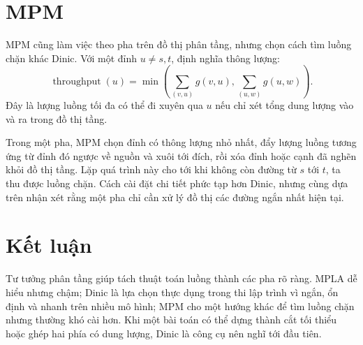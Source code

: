 \documentclass[11pt]{article}
\newcommand{\throughput}{\operatorname{throughput}}
\begin{document}
\section{MPM}

MPM cũng làm việc theo pha trên đồ thị phân tầng, nhưng chọn cách tìm luồng
chặn khác Dinic. Với một đỉnh \(u\ne s,t\), định nghĩa thông lượng:
\[
  \throughput(u)=
  \min\left(
    \sum_{(v,u)} g(v,u),
    \sum_{(u,w)} g(u,w)
  \right).
\]
Đây là lượng luồng tối đa có thể đi xuyên qua \(u\) nếu chỉ xét tổng dung
lượng vào và ra trong đồ thị tầng.

Trong một pha, MPM chọn đỉnh có thông lượng nhỏ nhất, đẩy lượng luồng tương
ứng từ đỉnh đó ngược về nguồn và xuôi tới đích, rồi xóa đỉnh hoặc cạnh đã
nghẽn khỏi đồ thị tầng. Lặp quá trình này cho tới khi không còn đường từ
\(s\) tới \(t\), ta thu được luồng chặn. Cách cài đặt chi tiết phức tạp hơn
Dinic, nhưng cùng dựa trên nhận xét rằng một pha chỉ cần xử lý đồ thị các
đường ngắn nhất hiện tại.

\section{Kết luận}

Tư tưởng phân tầng giúp tách thuật toán luồng thành các pha rõ ràng. MPLA dễ
hiểu nhưng chậm; Dinic là lựa chọn thực dụng trong thi lập trình vì ngắn,
ổn định và nhanh trên nhiều mô hình; MPM cho một hướng khác để tìm luồng chặn
nhưng thường khó cài hơn. Khi một bài toán có thể dựng thành cắt tối thiểu
hoặc ghép hai phía có dung lượng, Dinic là công cụ nên nghĩ tới đầu tiên.
\end{document}
